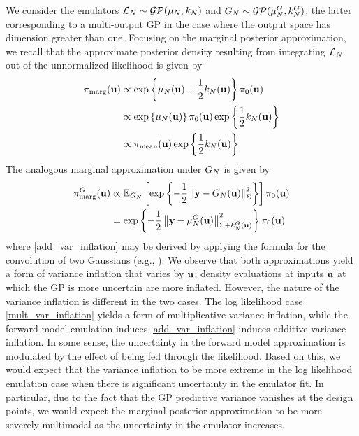 \documentclass[12pt]{article}
\begin{document}
We consider the emulators $\mathcal{L}_{N} \sim \mathcal{GP}(\mu_N, k_N)$ and $G_N \sim \mathcal{GP}(\mu^{G}_N, k^{G}_N)$, the latter corresponding 
to a multi-output GP in the case where the output space has dimension greater than one. Focusing on the marginal posterior approximation, 
we recall that the approximate posterior density resulting from integrating $\mathcal{L}_N$ out of the unnormalized likelihood is given by 
\begin{align}
\pi_{\text{marg}}(\mathbf{u}) 
&\propto \exp\left\{\mu_N(\mathbf{u}) + \frac{1}{2} k_N(\mathbf{u}) \right\} \pi_0(\mathbf{u}) \nonumber \\
&\propto \exp\left\{\mu_N(\mathbf{u}) \right\} \pi_0(\mathbf{u}) \exp\left\{\frac{1}{2} k_N(\mathbf{u}) \right\} \\
&\propto \pi_{\text{mean}}(\mathbf{u}) \exp\left\{\frac{1}{2} k_N(\mathbf{u}) \right\} \label{mult_var_inflation}
\end{align}
The analogous marginal approximation under $G_N$ is given by  
\begin{align}
\pi^{G}_{\text{marg}}(\mathbf{u}) 
&\propto \mathbb{E}_{G_N}\left[\exp\left\{-\frac{1}{2}\left\lVert\mathbf{y} - G_N(\mathbf{u})\right\rVert^2_{\Sigma} \right\} \right] \pi_0(\mathbf{u}) \nonumber \\
&= \exp\left\{-\frac{1}{2}\left\lVert\mathbf{y} - \mu^{G}_N(\mathbf{u})\right\rVert^2_{\Sigma + k^{G}_N(\mathbf{u})} \right\} \pi_0(\mathbf{u}) \label{add_var_inflation}
\end{align}
where \ref{add_var_inflation} may be derived by applying the formula for the convolution of two Gaussians (e.g., \cite{GP_PDE_priors}). We observe 
that both approximations yield a form of variance inflation that varies by $\mathbf{u}$; density evaluations at inputs $\mathbf{u}$ at which the GP is more uncertain 
are more inflated. However, the nature of the variance inflation is different in the two cases. The log likelihood case \ref{mult_var_inflation} yields a form 
of multiplicative variance inflation, while the forward model emulation induces \ref{add_var_inflation} induces additive variance inflation. In some sense, the 
uncertainty in the forward model approximation is modulated by the effect of being fed through the likelihood. Based on this, we would expect that the variance
inflation to be more extreme in the log likelihood emulation case when there is significant uncertainty in the emulator fit. In particular, due to the fact 
that the GP predictive variance vanishes at the design points, we would expect the marginal posterior approximation to be more severely multimodal as 
the uncertainty in the emulator increases. 
\end{document}
